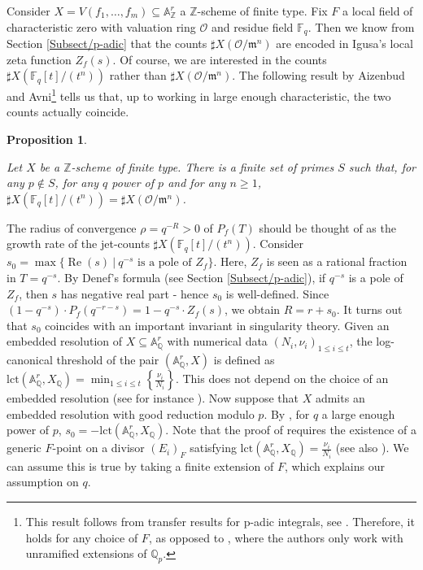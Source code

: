 \documentclass[11pt,english]{article}
\numberwithin{equation}{section}
\numberwithin{figure}{section}
\theoremstyle{definition}
\theoremstyle{plain}
\newtheorem{prop}[df]{Proposition}
\theoremstyle{remark}
\DeclareMathOperator{\Rea}{Re}
\newcommand\ZZ{\mathbb{Z}}
\newcommand\QQ{\mathbb{Q}}
\newcommand\FF{\mathbb{F}}
\begin{document}
Consider $X=V(f_{1},\ldots,f_{m})\subseteq\mathbb{A}_{\ZZ}^{r}$ a
$\ZZ$-scheme of finite type. Fix $F$ a local field of characteristic
zero with valuation ring $\mathcal{O}$ and residue field $\FF_{q}$.
Then we know from Section \ref{Subsect/p-adic} that the counts $\sharp X(\mathcal{O}/\mathfrak{m}^{n})$
are encoded in Igusa's local zeta function $Z_{f}(s)$. Of course,
we are interested in the counts $\sharp X(\mathbb{F}_{q}[t]/(t^{n}))$
rather than $\sharp X(\mathcal{O}/\mathfrak{m}^{n})$. The following
result by Aizenbud and Avni\footnote{This result follows from transfer results for p-adic integrals, see
\cite{CL05,CL10}. Therefore, it holds for any choice of $F$, as
opposed to \cite{AA18}, where the authors only work with unramified
extensions of $\mathbb{Q}_{p}$.} tells us that, up to working in large enough characteristic, the
two counts actually coincide.

\begin{prop}{\cite[Prop. 3.0.2.]{AA18}} \label{Prop/TsfPrinc}

Let $X$ be a $\mathbb{Z}$-scheme of finite type. There is a finite
set of primes $S$ such that, for any $p\notin S$, for any $q$ power
of $p$ and for any $n\geq1$, $\sharp X(\mathbb{F}_{q}[t]/(t^{n}))=\sharp X(\mathcal{O}/\mathfrak{m}^{n})$.

\end{prop}

The radius of convergence $\rho=q^{-R}>0$ of $P_{f}(T)$ should be
thought of as the growth rate of the jet-counts $\sharp X(\mathbb{F}_{q}[t]/(t^{n}))$.
Consider $s_{0}=\max\{\Rea(s)\ \vert\ q^{-s}\text{ is a pole of }Z_{f}\}$.
Here, $Z_{f}$ is seen as a rational fraction in $T=q^{-s}$. By Denef's
formula (see Section \ref{Subsect/p-adic}), if $q^{-s}$ is a pole
of $Z_{f}$, then $s$ has negative real part - hence $s_{0}$ is
well-defined. Since $(1-q^{-s})\cdot P_{f}(q^{-r-s})=1-q^{-s}\cdot Z_{f}(s)$,
we obtain $R=r+s_{0}$. It turns out that $s_{0}$ coincides with
an important invariant in singularity theory. Given an embedded resolution
of $X\subseteq\mathbb{A}_{\QQ}^{r}$ with numerical data $(N_{i},\nu_{i})_{1\leq i\leq t}$,
the log-canonical threshold of the pair $(\mathbb{A}_{\QQ}^{r},X)$
is defined as $\mathrm{lct}(\mathbb{A}_{\mathbb{Q}}^{r},X_{\mathbb{Q}})=\min_{1\leq i\leq t}\left\{ \frac{\nu_{i}}{N_{i}}\right\} $.
This does not depend on the choice of an embedded resolution (see
for instance \cite{Mus02}). Now suppose that $X$ admits an embedded
resolution with good reduction modulo $p$. By \cite[Thm. 2.7.]{VZG08},
for $q$ a large enough power of $p$, $s_{0}=-\mathrm{lct}(\mathbb{A}_{\mathbb{Q}}^{r},X_{\mathbb{Q}})$.
Note that the proof of \cite[Thm. 2.7.]{VZG08} requires the existence
of a generic $F$-point on a divisor $(E_{i})_{F}$ satisfying $\mathrm{lct}(\mathbb{A}_{\mathbb{Q}}^{r},X_{\mathbb{Q}})=\frac{\nu_{i}}{N_{i}}$
(see also \cite[Rmk. 2.8.2.]{VZG08}). We can assume this is true
by taking a finite extension of $F$, which explains our assumption
on $q$.
\end{document}
